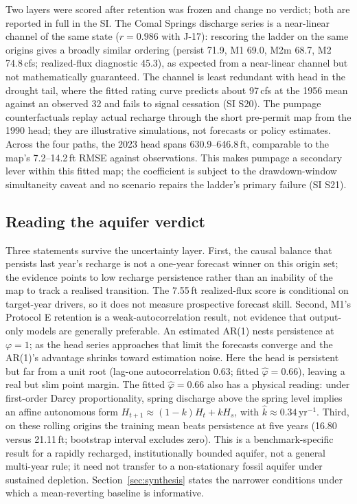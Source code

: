 \documentclass[preprint,11pt,authoryear]{elsarticle}
\theoremstyle{definition}
\theoremstyle{remark}
\begin{document}
Two layers were scored after retention was frozen and change no verdict; both are reported in full in the SI. The Comal Springs discharge series is a near-linear channel of the same state ($r=0.986$ with J-17): rescoring the ladder on the same origins gives a broadly similar ordering (persist 71.9, M1 69.0, M2m 68.7, M2 74.8\,cfs; realized-flux diagnostic 45.3), as expected from a near-linear channel but not mathematically guaranteed. The channel is least redundant with head in the drought tail, where the fitted rating curve predicts about 97\,cfs at the 1956 mean against an observed 32 and fails to signal cessation (SI S20). The pumpage counterfactuals replay actual recharge through the short pre-permit map from the 1990 head; they are illustrative simulations, not forecasts or policy estimates. Across the four paths, the 2023 head spans 630.9--646.8\,ft, comparable to the map's 7.2--14.2\,ft RMSE against observations. This makes pumpage a secondary lever within this fitted map; the coefficient is subject to the drawdown-window simultaneity caveat and no scenario repairs the ladder's primary failure (SI S21).

\subsection{Reading the aquifer verdict}\label{sec:edwreading}

Three statements survive the uncertainty layer. First, the causal balance that persists last year's recharge is not a one-year forecast winner on this origin set; the evidence points to low recharge persistence rather than an inability of the map to track a realised transition. The 7.55\,ft realized-flux score is conditional on target-year drivers, so it does not measure prospective forecast skill. Second, M1's Protocol E retention is a weak-autocorrelation result, not evidence that output-only models are generally preferable. An estimated AR(1) nests persistence at $\varphi=1$; as the head series approaches that limit the forecasts converge and the AR(1)'s advantage shrinks toward estimation noise. Here the head is persistent but far from a unit root (lag-one autocorrelation 0.63; fitted $\hat\varphi=0.66$), leaving a real but slim point margin.  The fitted $\hat\varphi=0.66$ also has a physical reading: under first-order Darcy proportionality, spring discharge above the spring level implies an affine autonomous form $H_{t+1}\approx(1-k)H_t+kH_s$, with $\hat k\approx0.34$\,yr$^{-1}$. Third, on these rolling origins the training mean beats persistence at five years (16.80 versus 21.11\,ft; bootstrap interval excludes zero). This is a benchmark-specific result for a rapidly recharged, institutionally bounded aquifer, not a general multi-year rule; it need not transfer to a non-stationary fossil aquifer under sustained depletion. Section~\ref{sec:synthesis} states the narrower conditions under which a mean-reverting baseline is informative.
\FloatBarrier
\end{document}
